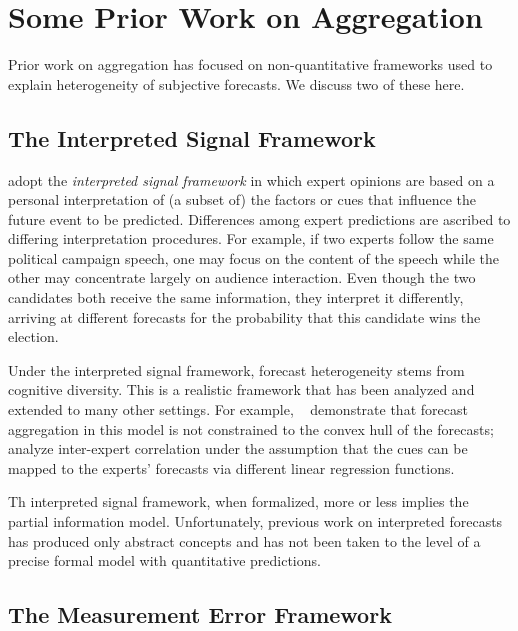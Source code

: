 \documentclass[11pt]{article}
\theoremstyle{definition}
\theoremstyle{definition}
\begin{document}
\section{Some Prior Work on Aggregation}
\label{sec:prior}

Prior work on aggregation has focused on non-quantitative
frameworks used to explain heterogeneity of subjective forecasts.  
We discuss two of these here.

\subsection{The Interpreted Signal Framework}
\label{ss:inerpreted}

\citet{hong2009interpreted} adopt the {\em interpreted 
signal framework} in which expert opinions are based on a personal
interpretation of (a subset of) the factors or cues that influence
the future event to be predicted.  Differences among expert
predictions are ascribed to differing interpretation procedures.
For example, if two experts follow the same political campaign
speech, one may focus on the content of the speech while the other 
may concentrate largely on audience interaction.  Even though the
two candidates both receive the same information, they interpret
it differently, arriving at different forecasts for the probability
that this candidate wins the election.  

Under the interpreted signal framework, forecast heterogeneity 
stems from cognitive diversity.  This is a realistic framework that
has been analyzed and extended to many other settings.  For example,
~\citet{parunak2013characterizing} demonstrate that 
forecast aggregation in this model is not constrained to the convex 
hull of the forecasts;~\citet{broomell2009experts}
analyze inter-expert correlation
under the assumption that the cues can be mapped to the experts'
forecasts via different linear regression functions.

Th interpreted signal framework, when formalized, more or less implies 
the partial information model.  Unfortunately, previous work on
interpreted forecasts has produced only abstract concepts and 
has not been taken to the level of a precise formal model with 
quantitative predictions.  

\subsection{The Measurement Error Framework}
\label{ss:measurement}
\end{document}
